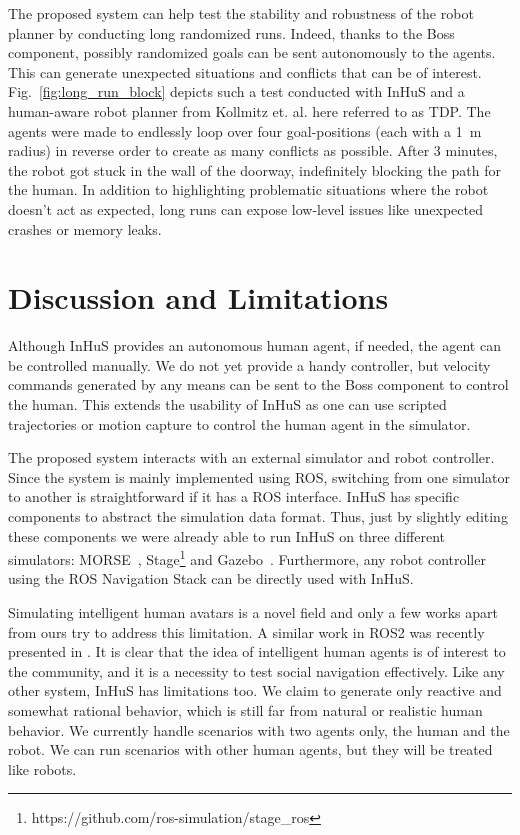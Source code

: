 The proposed system can help test the stability and robustness of the robot planner by conducting long randomized runs. Indeed, thanks to the Boss component, possibly randomized goals can be sent autonomously to the agents. This can generate unexpected situations and conflicts that can be of interest.
Fig.~\ref{fig:long_run_block} depicts such a test conducted with InHuS and a human-aware robot planner from Kollmitz et. al. \cite{kollmitz_time_2015} here referred to as TDP. The agents were made to endlessly loop over four goal-positions (each with a \SI{1}{\metre} radius) in reverse order to create as many conflicts as possible. After 3 minutes, the robot got stuck in the wall of the doorway, indefinitely blocking the path for the human. In addition to highlighting problematic situations where the robot doesn't act as expected, long runs can expose low-level issues like unexpected crashes or memory leaks.




\section{Discussion and Limitations}

Although InHuS provides an autonomous human agent, if needed, the agent can be controlled manually. We do not yet provide a handy controller, but velocity commands generated by any means can be sent to the Boss component to control the human. This extends the usability of InHuS as one can use scripted trajectories or motion capture to control the human agent in the simulator.

The proposed system interacts with an external simulator and robot controller. Since the system is mainly implemented using ROS, switching from one simulator to another is straightforward if it has a ROS interface. 
InHuS has specific components to abstract the simulation data format. Thus, just by slightly editing these components we were already able to run InHuS on three different simulators: MORSE~\cite{echeverria2011modular}, Stage\footnote{https://github.com/ros-simulation/stage\_ros} and Gazebo~\cite{koenig2004design}. Furthermore, any robot controller using the ROS Navigation Stack can be directly used with InHuS.

Simulating intelligent human avatars is a novel field and only a few works apart from ours try to address this limitation. A similar work in ROS2 was recently presented in \cite{perezhunavsim}.
It is clear that the idea of intelligent human agents is of interest to the community, and it is a necessity to test social navigation effectively. Like any other system, InHuS has limitations too. We claim to generate only reactive and somewhat rational behavior, which is still far from natural or realistic human behavior. We currently handle scenarios with two agents only, the human and the robot. We can run scenarios with other human agents, but they will be treated like robots.




